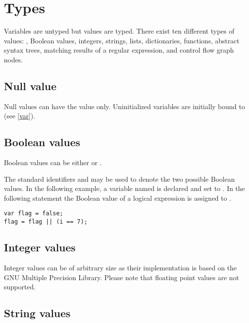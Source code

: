 \chapter{Types}

Variables are untyped but values are typed. There exist ten different
types of values: , Boolean values, integers, strings,
lists, dictionaries, functions, abstract syntax trees, matching
results of a regular expression, and control flow graph nodes.

\section{Null value}\label{null}

Null values can have the value  only.
Uninitialized variables are initially bound to 
(see \ref{var}).

\section{Boolean values}

Boolean values can be either  or .

The standard identifiers  and 
may be used to denote the two possible Boolean values. In
the following example, a variable named  is
declared and set to . In the following statement
the Boolean value of a logical expression is assigned to .

\begin{lstlisting}
var flag = false;
flag = flag || (i == 7);
\end{lstlisting}

\section{Integer values}\label{integer}

Integer values can be of arbitrary size as their implementation is based
on the GNU Multiple Precision Library. Please note that floating point
values are not supported.

\section{String values}\label{string}

